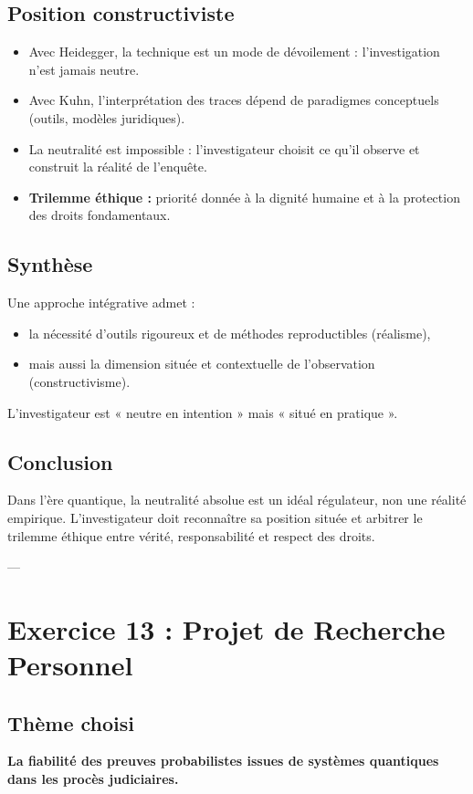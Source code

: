\documentclass[memoire, 12pt]{report}
\begin{document}
\begin{titlepage}
\subsection*{Position constructiviste}
\begin{itemize}
  \item Avec Heidegger, la technique est un mode de dévoilement : l’investigation n’est jamais neutre.
  \item Avec Kuhn, l’interprétation des traces dépend de paradigmes conceptuels (outils, modèles juridiques).
  \item La neutralité est impossible : l’investigateur choisit ce qu’il observe et construit la réalité de l’enquête.
  \item \textbf{Trilemme éthique :} priorité donnée à la dignité humaine et à la protection des droits fondamentaux.
\end{itemize}

\subsection*{Synthèse}
Une approche intégrative admet :
\begin{itemize}
  \item la nécessité d’outils rigoureux et de méthodes reproductibles (réalisme),
  \item mais aussi la dimension située et contextuelle de l’observation (constructivisme).
\end{itemize}
L’investigateur est « neutre en intention » mais « situé en pratique ».

\subsection*{Conclusion}
Dans l’ère quantique, la neutralité absolue est un idéal régulateur, non une réalité empirique. L’investigateur doit reconnaître sa position située et arbitrer le trilemme éthique entre vérité, responsabilité et respect des droits.

---

\section*{Exercice 13 : Projet de Recherche Personnel}

\subsection*{Thème choisi}
\textbf{La fiabilité des preuves probabilistes issues de systèmes quantiques dans les procès judiciaires.}


\end{titlepage}
\end{document}
